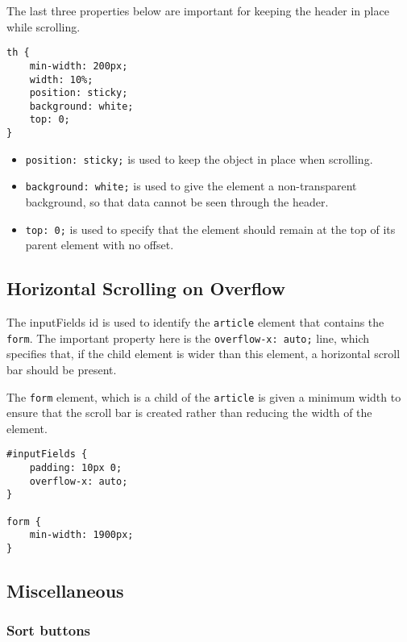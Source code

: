 \documentclass[letterpaper]{article}
\begin{document}
The last three properties below are important for keeping the header in place while scrolling.

\begin{lstlisting}[firstnumber=39]
th {
    min-width: 200px;
    width: 10%;
    position: sticky;
    background: white;
    top: 0;
}
\end{lstlisting}

\begin{itemize}
    \item \lstinline{position: sticky;} is used to keep the object in place when scrolling.
    \item \lstinline{background: white;} is used to give the element a non-transparent background, so that data cannot be seen through the header.
    \item \lstinline{top: 0;} is used to specify that the element should remain at the top of its parent element with no offset.
\end{itemize}

\subsection{Horizontal Scrolling on Overflow}\label{overflow-x}

The inputFields id is used to identify the \lstinline{article} element that contains the \lstinline{form}.
The important property here is the \lstinline{overflow-x: auto;} line, which specifies that, if the child element is wider than this element, a horizontal scroll bar should be present.

The \lstinline{form} element, which is a child of the \lstinline{article} is given a minimum width to ensure that the scroll bar is created rather than reducing the width of the element.

\begin{lstlisting}[firstnumber=5]
#inputFields {
    padding: 10px 0;
    overflow-x: auto;
}

form {
    min-width: 1900px;
}
\end{lstlisting}

\subsection{Miscellaneous}

\subsubsection{Sort buttons}
\end{document}
